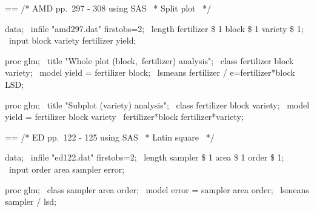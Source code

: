 \documentclass{book}
\makeatletter
\newenvironment{Texinfopreformatted}{%
  \par\GNUTobeylines\obeyspaces\frenchspacing\parskip=\z@\parindent=\z@}{}
{\catcode`\^^M=13 \gdef\GNUTobeylines{\catcode`\^^M=13 \def^^M{\null\par}}}
\newenvironment{Texinfoindented}{\begin{list}{}{}\item\relax}{\end{list}}
\renewcommand{\_}{\Texinfounderscore\discretionary{}{}{}}
\makeatother
\begin{document}
\begin{Texinfoindented}
\begin{Texinfopreformatted}%
\ttfamily 
/* AMD pp.\ 297 - 308 using SAS
\ * Split plot
\ */

data;
\ infile "amd297.dat" firstobs=2;
\ length fertilizer \$ 1 block \$ 1 variety \$ 1;
\ input block variety fertilizer yield;

proc glm;
\ title "Whole plot (block,\ fertilizer) analysis";
\ class fertilizer block variety;
\ model yield = fertilizer block;
\ lsmeans fertilizer / e=fertilizer*block LSD;

proc glm;
\ title "Subplot (variety) analysis";
\ class fertilizer block variety;
\ model yield = fertilizer block variety
\               fertilizer*block fertilizer*variety;


\end{Texinfopreformatted}
\end{Texinfoindented}

\begin{Texinfoindented}
\begin{Texinfopreformatted}%
\ttfamily 
/* ED pp.\ 122 - 125 using SAS
\ * Latin square
\ */

data;
\ infile "ed122.dat" firstobs=2;
\ length sampler \$ 1 area \$ 1 order \$ 1;
\ input order area sampler error;

proc glm;
\ class sampler area order;
\ model error = sampler area order;
\ lsmeans sampler / lsd;

\end{Texinfopreformatted}
\end{Texinfoindented}
\end{document}
